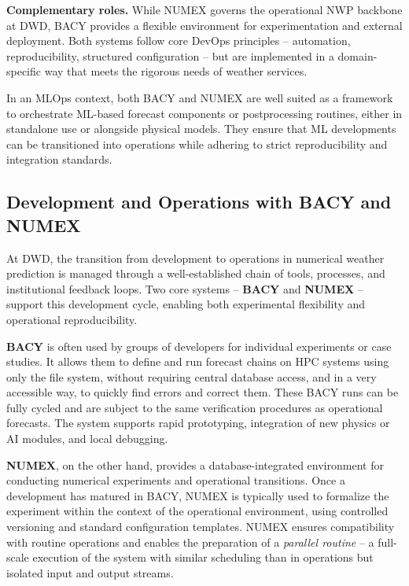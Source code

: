 {\bf Complementary roles.} While NUMEX governs the operational NWP backbone at DWD, BACY provides a flexible environment for experimentation and external deployment. Both systems follow core DevOps principles -- automation, reproducibility, structured configuration -- but are implemented in a domain-specific way that meets the rigorous needs of weather services.

In an MLOps context, both BACY and NUMEX are well suited as a framework to orchestrate ML-based forecast components or postprocessing routines, either in standalone use or alongside physical models. They ensure that ML developments can be transitioned into operations while adhering to strict reproducibility and integration standards. 

%
\subsection{Development and Operations with BACY and NUMEX}

At DWD, the transition from development to operations in numerical weather prediction is managed through a well-established chain of tools, processes, and institutional feedback loops. Two core systems -- {\bf BACY} and {\bf NUMEX} -- support this development cycle, enabling both experimental flexibility and operational reproducibility.

{\bf BACY} is often used by groups of developers for individual experiments or case studies. It allows them to define and run forecast chains on HPC systems using only the file system, without requiring central database access, and in a very accessible way, to quickly find errors and correct them. These BACY runs can be fully cycled and are subject to the same verification procedures as operational forecasts. The system supports rapid prototyping, integration of new physics or AI modules, and local debugging. 

{\bf NUMEX}, on the other hand, provides a database-integrated environment for conducting numerical experiments and operational transitions. Once a development has matured in BACY, NUMEX is typically used to formalize the experiment within the context of the operational environment, using controlled versioning and standard configuration templates. NUMEX ensures compatibility with routine operations and enables the preparation of a {\em parallel routine} -- a full-scale execution of the system with similar scheduling than in operations but isolated input and output streams.

